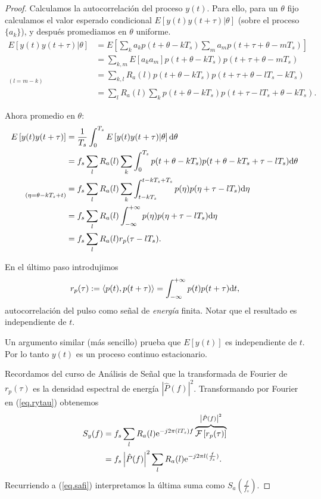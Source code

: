\begin{proof} Calculamos la autocorrelación del proceso $y(t)$. Para ello, para un $\theta$ fijo calculamos el valor esperado
condicional $E\left[y(t) y(t+\tau)|\theta\right]$ (sobre el
proceso $\{a_k\}$), y después promediamos en $\theta$ uniforme.
\begin{align*}
    E\left[y(t)y(t+\tau)|\theta\right]  & = E\left[\sum_k a_k p(t+\theta-kT_s) \sum_m a_m p(t+\tau+\theta-mT_s)\right]\\
                        & = \sum_{k,m} E[a_k a_m] p(t+\theta - kT_s) p(t+\tau+\theta-mT_s)\\
        \underset{\scriptstyle(l=m-k)}{} & =  \sum_{k,l} R_a(l) p(t+\theta-kT_s) p(t+\tau+\theta-lT_s-kT_s)\\
                        & = \sum_l R_a(l) \sum_k p(t+\theta-kT_s)
                        p(t+\tau-lT_s+\theta-kT_s).
\end{align*}

Ahora promedio en $\theta$:
\begin{align}\label{eq.rytau}
    E\left[y(t)y(t+\tau)\right]         & = \frac{1}{T_s}\int_0^{T_s} E\left[y(t)y(t+\tau)|\theta\right]\mathrm{d}\theta  \nonumber \\
                        & = f_s \sum_l R_a(l) \sum_k\int_0^{T_s} p(t+\theta-kT_s) p(t+\theta-kT_s + \tau-lT_s)\mathrm{d}\theta \nonumber\\
\underset{\scriptstyle(\eta=\theta-kT_s+t)}{}    & = f_s  \sum_l R_a(l) \sum_k \int_{t-kT_s}^{t-kT_s+T_s} p(\eta) p(\eta + \tau - lT_s)\mathrm{d}\eta\nonumber\\
                        & = f_s \sum_l R_a(l) \int_{-\infty}^{+\infty} p(\eta) p(\eta + \tau-lT_s)\mathrm{d}\eta\nonumber\\
                        & = f_s \sum_l R_a(l) r_p(\tau-lT_s).
\end{align}

En el último paso introdujimos
\[
r_p(\tau) := \left\langle p(t),p(t+\tau)\right\rangle = \int_{-\infty}^{+\infty} p(t) p(t + \tau)\mathrm{d} t,
\]
autocorrelación del pulso como señal de {\em energía} finita. Notar que el resultado es independiente de $t$.

Un argumento similar (más sencillo) prueba que $E[y(t)]$ es  independiente de $t$. Por lo tanto $y(t)$ es un proceso continuo
estacionario.

Recordamos del curso de Análisis de Se\~nal que la transformada de Fourier de $r_p(\tau)$ es la densidad espectral de energía
$|\hat{P}(f)|^2$. Transformando por Fourier en (\ref{eq.rytau}) obtenemos
\begin{align*}
    S_y(f)  & = f_s \sum_l R_a(l) \mathrm{e}^{-j2\pi(lT_s)f} \overbrace{\mathcal{F}\left[r_p(\tau)\right]}^{\left|\hat{P}(f)\right|^2}\\
        & = f_s \left|\hat{P}(f)\right|^2\sum_l R_a(l) \mathrm{e}^{-j2\pi l
        (\frac{f}{f_s})}.
\end{align*}
Recurriendo a (\ref{eq.safi}) interpretamos la última suma como
$S_a\left(\frac{f}{f_s}\right).$

\end{proof}


